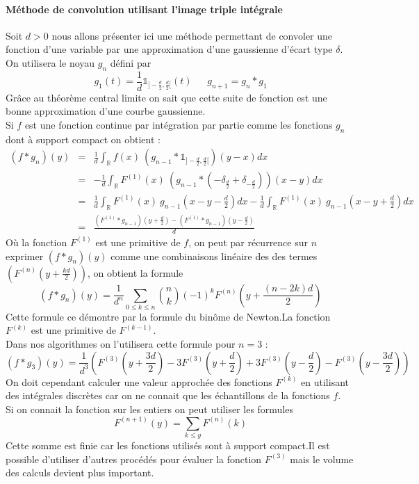 \paragraph{Méthode de convolution utilisant l'image  triple intégrale}
Soit $d>0$ nous allons présenter ici une méthode permettant de convoler une fonction d'une variable par une approximation d'une gaussienne d'écart type $\delta$.\\
On utilisera le noyau $g_n$ défini par 
\begin{equation*}
g_1(t)=\frac{1}{d}\mathds{1}_{]-\frac{d}{2},\frac{d}{2}[}(t) ~~~~~~~g_{n+1}= g_n * g_1
\end{equation*}
Grâce au théorème central limite on sait que cette suite de fonction est une bonne approximation d'une courbe gaussienne.\\
Si $f$ est une fonction continue par intégration par partie comme les fonctions $g_n$ dont à support compact on obtient  :
\begin{eqnarray*}
(f * g_n )(y)&=&\frac{1}{d} \int_{\mathbb{R}} f(x)~(g_{n-1} * \mathds{1}_{]-\frac{d}{2},\frac{d}{2}[})(y-x) dx\\
                 &=& -\frac{1}{d} \int_{\mathbb{R}} F^{(1)}(x)~(g_{n-1} * (-\delta_{\frac{d}{2}}+\delta_{-\frac{d}{2}}))(x-y) dx\\
                 &=& \frac{1}{d} \int_{\mathbb{R}} F^{(1)}(x)~g_{n-1}(x-y-\frac{d}{2} )dx -\frac{1}{d} \int_{\mathbb{R}} F^{(1)}(x)~g_{n-1}(x-y+\frac{d}{2})dx\\
                 &=& \frac{(F^{(1)} * g_{n-1})(y+\frac{d}{2})-(F^{(1)} * g_{n-1} )(y-\frac{d}{2})}{d}
\end{eqnarray*}
Où la fonction $F^{(1)}$ est une primitive de $f$, on peut par récurrence sur $n$ exprimer $(f*g_{n})(y)$ comme une combinaisons linéaire des des termes $\left(F^{(n)}\left(y+\frac{kd}{2}\right)\right)$, on obtient la formule
\begin{equation*}
(f*g_n)(y)=\frac{1}{d^n}\underset{0 \le k\le n}{\sum} \binom{n}{k}(-1)^{k} F^{(n)}(y+\frac{(n-2k)d}{2})
\end{equation*}
Cette formule ce démontre par la formule du binôme de Newton.La fonction $F^{(k)}$ est une primitive de $F^{(k-1)}$.\\
Dans nos algorithmes  on l'utilisera cette formule pour $n=3$ :
\begin{equation*}
(f*g_3)(y)=\frac{1}{d^3}(F^{(3)}(y+\frac{3d}{2})-3F^{(3)}(y+\frac{d}{2})+3F^{(3)}(y-\frac{d}{2})-F^{(3)}(y-\frac{3d}{2}))
\end{equation*}
On doit cependant calculer une valeur approchée des fonctions $F^{(k)}$ en utilisant des intégrales discrètes car on ne connait que les échantillons de la fonctions $f$.\\
Si on connait la fonction sur les entiers on peut utiliser les formules
\begin{equation*}
F^{(n+1)}(y)=\underset{k\le y}{\sum}F^{(n)}(k)
\end{equation*}
Cette somme est finie car les fonctions utilisés sont à support compact.Il est possible d'utiliser d'autres procédés pour évaluer la fonction $F^{(3)}$ mais le volume des calculs devient plus important.\\

